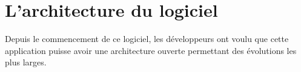 \documentclass[a4paper,10pt,oneside,french]{sphinxmanual}
\begin{document}
\noindent{}

\noindent{}


\section{L’architecture du logiciel}
\label{\detokenize{CORE/architecture:l-architecture-du-logiciel}}\label{\detokenize{CORE/architecture::doc}}
Depuis le commencement de ce logiciel, les développeurs ont voulu que cette application puisse avoir une architecture ouverte permettant des évolutions les plus larges.



\renewcommand{\indexname}{Index}
\printindex
\end{document}
